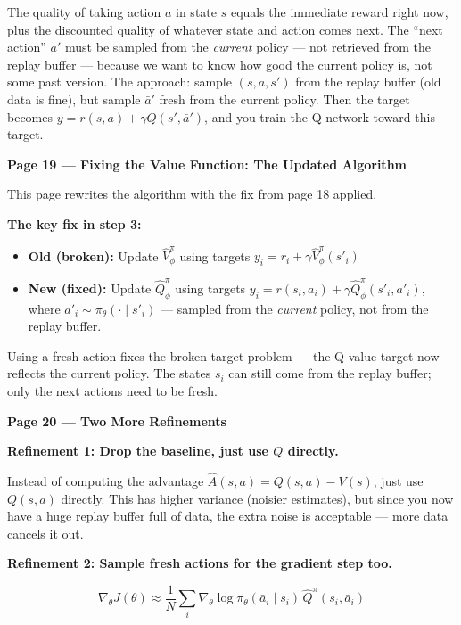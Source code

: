 \medskip
The quality of taking action $a$ in state $s$ equals the immediate reward right
now, plus the discounted quality of whatever state and action comes next.
The ``next action'' $\bar{a}'$ must be sampled from the \textit{current} policy ---
not retrieved from the replay buffer --- because we want to know how good the
current policy is, not some past version.
The approach: sample $(s, a, s')$ from the replay buffer (old data is fine),
but sample $\bar{a}'$ fresh from the current policy.
Then the target becomes $y = r(s, a) + \gamma Q(s', \bar{a}')$, and you
train the Q-network toward this target.

\bigskip

\textbf{Page 19 --- Fixing the Value Function: The Updated Algorithm}

\medskip
This page rewrites the algorithm with the fix from page 18 applied.

\medskip
\textbf{The key fix in step 3:}
\begin{itemize}
    \item \textbf{Old (broken):} Update $\hat{V}^{\pi}_\phi$ using targets
          $y_i = r_i + \gamma \hat{V}^{\pi}_\phi(s'_i)$
    \item \textbf{New (fixed):} Update $\hat{Q}^{\pi}_\phi$ using targets
          $y_i = r(s_i, a_i) + \gamma \hat{Q}^{\pi}_\phi(s'_i, a'_i)$,
          where $a'_i \sim \pi_\theta(\cdot \mid s'_i)$ --- sampled from the
          \textit{current} policy, not from the replay buffer.
\end{itemize}

\medskip
Using a fresh action fixes the broken target problem --- the Q-value target now
reflects the current policy. The states $s_i$ can still come from the replay buffer;
only the next actions need to be fresh.

\bigskip

\textbf{Page 20 --- Two More Refinements}

\medskip
\textbf{Refinement 1: Drop the baseline, just use $Q$ directly.}

Instead of computing the advantage $\hat{A}(s, a) = Q(s, a) - V(s)$, just use
$Q(s, a)$ directly. This has higher variance (noisier estimates), but since you
now have a huge replay buffer full of data, the extra noise is acceptable ---
more data cancels it out.

\medskip
\textbf{Refinement 2: Sample fresh actions for the gradient step too.}

\[
    \nabla_\theta J(\theta)
    \approx \frac{1}{N} \sum_i
    \nabla_\theta \log \pi_\theta(\bar{a}_i \mid s_i) \,
    \hat{Q}^{\pi}(s_i, \bar{a}_i)
\]

